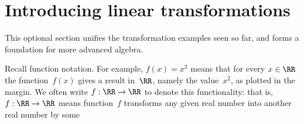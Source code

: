 

\section{Introducing linear transformations}
\label{sec:ilt}
\secttoc
\begin{comment}
\pooliv{\S3.6} \layiv{\S1.8--9} \holti{\S3.1}
\end{comment}


\begin{aside}
This optional section unifies the transformation examples seen so far, and forms a foundation for more advanced algebra. 
\end{aside}

Recall function notation.
For example, \(f(x)=x^2\) means that for every \(x\in\RR\) the function~\(f(x)\) gives a result in~\(\RR\), namely the value~\(x^2\), as plotted in the margin.  
%
We often write \(f:\RR\to\RR\) to denote this functionality: that is, \(f:\RR\to\RR\) means function~\(f\) transforms any given real number into another real number by some 

